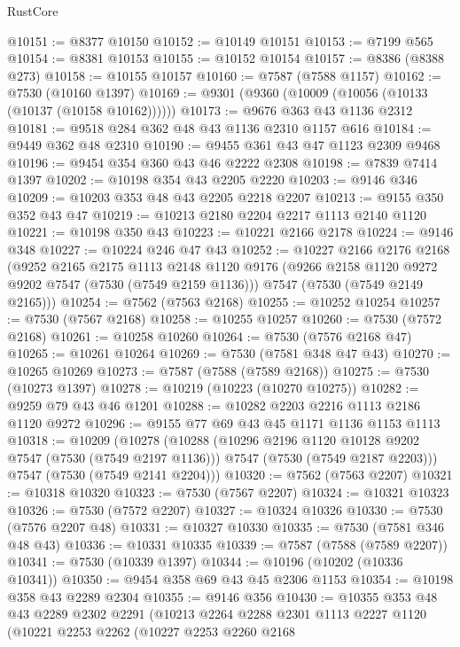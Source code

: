 \begin{lexlean}{RustCore}
\begin{coremodule}
@10151 := @8377 @10150
@10152 := @10149 @10151
@10153 := @7199 @565
@10154 := @8381 @10153
@10155 := @10152 @10154
@10157 := @8386 (@8388 @273)
@10158 := @10155 @10157
@10160 := @7587 (@7588 @1157)
@10162 := @7530 (@10160 @1397)
@10169 := @9301 (@9360 (@10009 (@10056 (@10133 (@10137 (@10158 @10162))))))
@10173 := @9676 @363 @43 @1136 @2312
@10181 := @9518 @284 @362 @48 @43 @1136 @2310 @1157 @616
@10184 := @9449 @362 @48 @2310
@10190 := @9455 @361 @43 @47 @1123 @2309 @9468
@10196 := @9454 @354 @360 @43 @46 @2222 @2308
@10198 := @7839 @7414 @1397
@10202 := @10198 @354 @43 @2205 @2220
@10203 := @9146 @346
@10209 := @10203 @353 @48 @43 @2205 @2218 @2207
@10213 := @9155 @350 @352 @43 @47
@10219 := @10213 @2180 @2204 @2217 @1113 @2140 @1120
@10221 := @10198 @350 @43
@10223 := @10221 @2166 @2178
@10224 := @9146 @348
@10227 := @10224 @246 @47 @43
@10252 := @10227
    @2166
    @2176
    @2168
    (@9252
      @2165
      @2175
      @1113
      @2148
      @1120
      @9176
      (@9266 @2158 @1120 @9272 @9202 @7547 (@7530 (@7549 @2159 @1136)))
      @7547
      (@7530 (@7549 @2149 @2165)))
@10254 := @7562 (@7563 @2168)
@10255 := @10252 @10254
@10257 := @7530 (@7567 @2168)
@10258 := @10255 @10257
@10260 := @7530 (@7572 @2168)
@10261 := @10258 @10260
@10264 := @7530 (@7576 @2168 @47)
@10265 := @10261 @10264
@10269 := @7530 (@7581 @348 @47 @43)
@10270 := @10265 @10269
@10273 := @7587 (@7588 (@7589 @2168))
@10275 := @7530 (@10273 @1397)
@10278 := @10219 (@10223 (@10270 @10275))
@10282 := @9259 @79 @43 @46 @1201
@10288 := @10282 @2203 @2216 @1113 @2186 @1120 @9272
@10296 := @9155 @77 @69 @43 @45 @1171 @1136 @1153 @1113
@10318 := @10209
    (@10278
      (@10288
        (@10296 @2196 @1120 @10128 @9202 @7547 (@7530 (@7549 @2197 @1136)))
        @7547
        (@7530 (@7549 @2187 @2203)))
      @7547
      (@7530 (@7549 @2141 @2204)))
@10320 := @7562 (@7563 @2207)
@10321 := @10318 @10320
@10323 := @7530 (@7567 @2207)
@10324 := @10321 @10323
@10326 := @7530 (@7572 @2207)
@10327 := @10324 @10326
@10330 := @7530 (@7576 @2207 @48)
@10331 := @10327 @10330
@10335 := @7530 (@7581 @346 @48 @43)
@10336 := @10331 @10335
@10339 := @7587 (@7588 (@7589 @2207))
@10341 := @7530 (@10339 @1397)
@10344 := @10196 (@10202 (@10336 @10341))
@10350 := @9454 @358 @69 @43 @45 @2306 @1153
@10354 := @10198 @358 @43 @2289 @2304
@10355 := @9146 @356
@10430 := @10355
    @353
    @48
    @43
    @2289
    @2302
    @2291
    (@10213
      @2264
      @2288
      @2301
      @1113
      @2227
      @1120
      (@10221
        @2253
        @2262
        (@10227
          @2253
          @2260
          @2168

\end{coremodule}
\end{lexlean}
